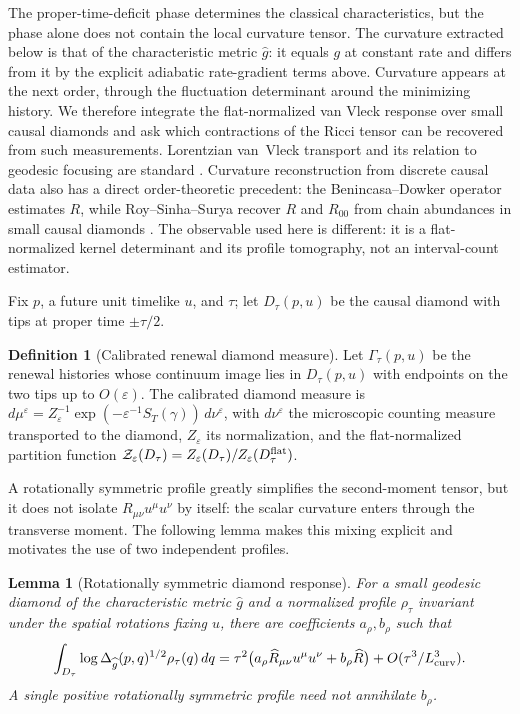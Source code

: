 \documentclass[11pt]{article}
\newtheorem{lemma}[theorem]{Lemma}
\theoremstyle{definition}
\newtheorem{definition}[theorem]{Definition}
\theoremstyle{remark}
\newcommand{\eps}{\varepsilon}
\newcommand{\wideg}{\widehat g}
\begin{document}
The proper-time-deficit phase determines the classical characteristics, but the
phase alone does not contain the local curvature tensor.  The curvature extracted
below is that of the characteristic metric $\wideg$: it equals $g$ at constant
rate and differs from it by the explicit adiabatic rate-gradient terms above.  Curvature appears at the
next order, through the fluctuation determinant around the minimizing history.
We therefore integrate the flat-normalized van Vleck response over small causal
diamonds and ask which contractions of the Ricci tensor can be recovered from
such measurements.  Lorentzian van~Vleck transport and its relation to geodesic
focusing are standard \cite{VisserVanVleck}.  Curvature reconstruction from
discrete causal data also has a direct order-theoretic precedent: the
Benincasa--Dowker operator estimates $R$, while Roy--Sinha--Surya recover $R$ and
$R_{00}$ from chain abundances in small causal diamonds
\cite{BenincasaDowker,RoySinhaSurya}.  The observable used here is different:
it is a flat-normalized kernel determinant and its profile tomography, not an
interval-count estimator.

Fix $p$, a future unit timelike $u$, and $\tau$; let $D_\tau(p,u)$ be the causal
diamond with tips at proper time $\pm\tau/2$.

\begin{definition}[Calibrated renewal diamond measure]
\label{def:diamond-measure}
Let $\Gamma_\tau(p,u)$ be the renewal histories whose continuum image lies in
$D_\tau(p,u)$ with endpoints on the two tips up to $O(\eps)$.  The calibrated
diamond measure is
$d\mu^\eps=Z_\eps^{-1}\exp(-\eps^{-1}S_T(\gamma))\,d\nu^\eps$, with $d\nu^\eps$ the
microscopic counting measure transported to the diamond, $Z_\eps$ its
normalization, and the flat-normalized partition function
$\mathcal Z_\eps(D_\tau)=Z_\eps(D_\tau)/Z_\eps(D_\tau^{\rm flat})$.
\end{definition}

A rotationally symmetric profile greatly simplifies the second-moment tensor,
but it does not isolate $R_{\mu\nu}u^\mu u^\nu$ by itself: the scalar curvature
enters through the transverse moment.  The following lemma makes this mixing
explicit and motivates the use of two independent profiles.

\begin{lemma}[Rotationally symmetric diamond response]
\label{lem:vvm-average}
For a small geodesic diamond of the characteristic metric $\wideg$ and a
normalized profile $\rho_\tau$ invariant under the spatial rotations fixing
$u$, there are coefficients $a_\rho,b_\rho$ such that
\[
 \int_{D_\tau}\log\Delta_{\wideg}(p,q)^{1/2}\rho_\tau(q)\,dq
 =\tau^2\bigl(a_\rho\widehat R_{\mu\nu}u^\mu u^\nu
             +b_\rho\widehat R\bigr)
 +O(\tau^3/L_{\rm curv}^3).
\]
A single positive rotationally symmetric profile need not annihilate
$b_\rho$.
\end{lemma}
\end{document}
